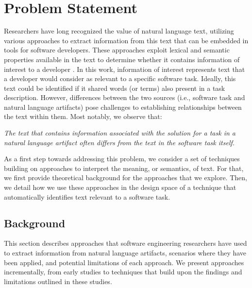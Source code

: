 \clearpage

\section{Problem Statement}
\label{cp5:motivation}





Researchers have long recognized the value of natural language
text, utilizing various approaches to extract
information from this text that can be embedded in
tools for software developers.
These approaches exploit lexical and semantic properties available in the text to determine 
whether it contains information of interest to a developer . 
In this work, information of interest represents text that a developer would consider as relevant to a specific software task. Ideally, this text could be identified if it shared  
words (or terms) also present in a task description. However, differences between the two sources (i.e., software task and natural language artifacts) pose challenges to establishing relationships between the text within them. Most notably, we observe that:



\medskip
\begin{bluequote}
    \textit{The text  that contains information associated with the solution for a task in a natural language artifact often differs from the text in the software task itself.}
\end{bluequote}





As a first step towards addressing this problem, we consider a set of techniques
 building on approaches to interpret the meaning, or semantics, of text.
 For that, we first provide theoretical background for the approaches that we explore. Then, we detail how we use these approaches in the design space of a technique that automatically identifies text relevant to a software task.





 \subsection{Background}
 \label{cp5:background}


This section describes approaches that software engineering researchers have used to extract information from natural language artifacts, scenarios where they have been applied, and potential limitations of each approach. We present approaches incrementally, from early studies to techniques that build upon the findings
and limitations outlined in these studies.



